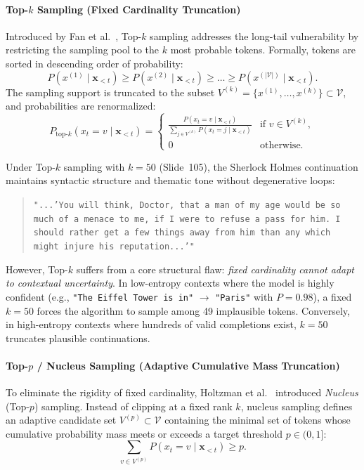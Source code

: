 \documentclass[../../../main.tex]{subfiles}
\begin{document}
\paragraph{Top-$k$ Sampling (Fixed Cardinality Truncation)}
Introduced by Fan et al.~\cite{fan2018}, Top-$k$ sampling addresses the long-tail vulnerability by restricting the sampling pool to the $k$ most probable tokens. Formally, tokens are sorted in descending order of probability:
\begin{equation}
P(x^{(1)} \mid \mathbf{x}_{<t}) \ge P(x^{(2)} \mid \mathbf{x}_{<t}) \ge \dots \ge P(x^{(|\mathcal{V}|)} \mid \mathbf{x}_{<t}).
\end{equation}
The sampling support is truncated to the subset $V^{(k)} = \{x^{(1)}, \dots, x^{(k)}\} \subset \mathcal{V}$, and probabilities are renormalized:
\begin{equation}
P_{\text{top-}k}(x_t = v \mid \mathbf{x}_{<t}) = \begin{cases}
\frac{P(x_t = v \mid \mathbf{x}_{<t})}{\sum_{j \in V^{(k)}} P(x_t = j \mid \mathbf{x}_{<t})} & \text{if } v \in V^{(k)}, \\
0 & \text{otherwise}.
\end{cases}
\label{eq:top_k_renormalization}
\end{equation}

Under Top-$k$ sampling with $k=50$ (Slide~105), the Sherlock Holmes continuation maintains syntactic structure and thematic tone without degenerative loops:
\begin{quote}
\texttt{"...'You will think, Doctor, that a man of my age would be so much of a menace to me, if I were to refuse a pass for him. I should rather get a few things away from him than any which might injure his reputation...'"}
\end{quote}

However, Top-$k$ suffers from a core structural flaw: \emph{fixed cardinality cannot adapt to contextual uncertainty}. In low-entropy contexts where the model is highly confident (e.g., \texttt{"The Eiffel Tower is in"} $\to$ \texttt{"Paris"} with $P=0.98$), a fixed $k=50$ forces the algorithm to sample among 49 implausible tokens. Conversely, in high-entropy contexts where hundreds of valid completions exist, $k=50$ truncates plausible continuations.

\paragraph{Top-$p$ / Nucleus Sampling (Adaptive Cumulative Mass Truncation)}
To eliminate the rigidity of fixed cardinality, Holtzman et al.~\cite{holtzman2020} introduced \emph{Nucleus} (Top-$p$) sampling. Instead of clipping at a fixed rank $k$, nucleus sampling defines an adaptive candidate set $V^{(p)} \subset \mathcal{V}$ containing the minimal set of tokens whose cumulative probability mass meets or exceeds a target threshold $p \in (0, 1]$:
\begin{equation}
\sum_{v \in V^{(p)}} P(x_t = v \mid \mathbf{x}_{<t}) \ge p.
\label{eq:nucleus_set_definition}
\end{equation}
\end{document}
